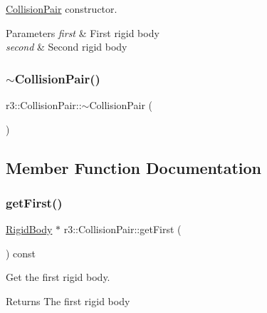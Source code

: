 \mbox{\hyperlink{classr3_1_1_collision_pair}{Collision\+Pair}} constructor. 


\begin{DoxyParams}{Parameters}
{\em first} & First rigid body \\
\hline
{\em second} & Second rigid body \\
\hline
\end{DoxyParams}
\mbox{\label{classr3_1_1_collision_pair_a38ae2cf6732b5a1b4dfdc544bbff82e0}} 
\subsubsection{\texorpdfstring{$\sim$\+Collision\+Pair()}{~CollisionPair()}}
{\footnotesize\ttfamily r3\+::\+Collision\+Pair\+::$\sim$\+Collision\+Pair (\begin{DoxyParamCaption}{ }\end{DoxyParamCaption})\hspace{0.3cm}{\ttfamily [default]}}



\subsection{Member Function Documentation}
\mbox{\label{classr3_1_1_collision_pair_a603f9437f7fa4aa5253ad26247ee75ae}} 
\subsubsection{\texorpdfstring{get\+First()}{getFirst()}}
{\footnotesize\ttfamily \mbox{\hyperlink{classr3_1_1_rigid_body}{Rigid\+Body}} $\ast$ r3\+::\+Collision\+Pair\+::get\+First (\begin{DoxyParamCaption}{ }\end{DoxyParamCaption}) const}



Get the first rigid body. 

\begin{DoxyReturn}{Returns}
The first rigid body 
\end{DoxyReturn}
\mbox{\label{classr3_1_1_collision_pair_a218a4ee7500ed53c3ba5384833afff5a}} 

